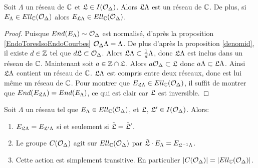 \begin{Prop}
	Soit $\Lambda$ un réseau de $\mathbb{C}$ et $\mathfrak{L}\in I(\mathcal{O}_{\Delta})$.  Alors $\mathfrak{L}\Lambda$ est un réseau de $\mathbb{C}$. De plus, si $E_{\Lambda}\in Ell_{\mathbb{C}}(\mathcal{O}_{\Delta})$ alors $E_{\mathfrak{L}\Lambda}\in Ell_{\mathbb{C}}(\mathcal{O}_{\Delta})$.
\end{Prop}

\begin{proof}
	Puisque $End(E_{\Lambda}) \sim \mathcal{O}_{\Delta}$ est normalisé, d'après la proposition \ref{EndoToresIsoEndoCourbes} $\mathcal{O}_{\Delta}\Lambda = \Lambda$. De plus d'après la proposition \ref{denomid}, il existe $d\in\mathbb{Z}$ tel que $d\mathfrak{L}\subset\mathcal{O}_{\Delta}$. Alors $\mathfrak{L}\Lambda\subset\frac{1}{d}\Lambda$, donc $\mathfrak{L}\Lambda$ est inclus dans un réseau de $\mathbb{C}$. Maintenant soit $a\in\mathbb{Z}\cap\mathfrak{L}$. Alors $a\mathcal{O}_{\Delta}\subset\mathfrak{L}$ donc $a\Lambda\subset\mathfrak{L}\Lambda$. Ainsi $\mathfrak{L}\Lambda$ contient un réseau de $\mathbb{C}$. $\mathfrak{L}\Lambda$ est compris entre deux réseaux, donc est lui même un réseau de $\mathbb{C}$. Pour montrer que $E_{\mathfrak{L}\Lambda}\in Ell_{\mathbb{C}}(\mathcal{O}_{\Delta})$, il suffit de montrer que $End(E_{\mathfrak{L}\Lambda}) = End(E_{\Lambda})$, ce qui est clair car $\mathfrak{L}$ est inversible. 
\end{proof}


\begin{Prop}\label{ActionClassesSTrans}
	Soit $\Lambda$ un réseau tel que $E_{\Lambda}\in Ell_{\mathbb{C}}(\mathcal{O}_{\Delta})$, et $\mathfrak{L}$, $\mathfrak{L}'\in I(\mathcal{O}_{\Delta})$. Alors:
	\begin{enumerate}
		\item $E_{\mathfrak{L}\Lambda} = E_{\mathfrak{L}'\Lambda}$ si et seulement si $\tilde{\mathfrak{L}} = \tilde{\mathfrak{L}}'$.
		\item Le groupe $C(\mathcal{O}_{\Delta})$ agit sur $Ell_{\mathbb{C}}(\mathcal{O}_{\Delta})$ par $\tilde{\mathfrak{L}}\cdot E_{\Lambda} = E_{\mathfrak{L}^{-1}\Lambda}$.
		\item Cette action est simplement transitive. En particulier $\left| C(\mathcal{O}_{\Delta})\right| = \left| Ell_{\mathbb{C}}(\mathcal{O}_{\Delta})\right| $.
	\end{enumerate}
\end{Prop}

